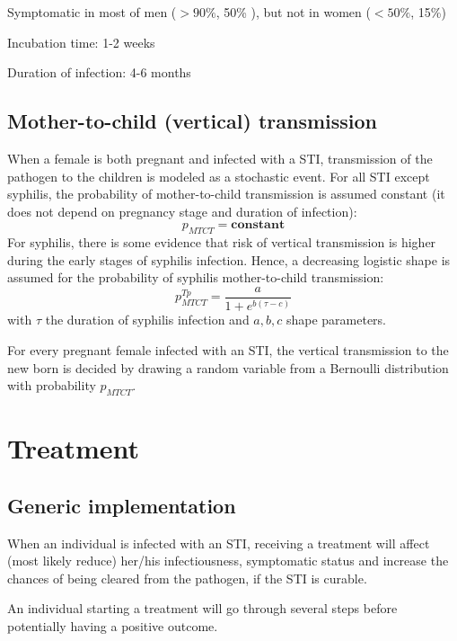 \documentclass[11pt, onecolumn]{article}
\begin{document}
 Symptomatic in most of men ($> 90\%$\cite{Ison:2011eg,Kretzschmar:1996ur}, 50\%\cite{Korenromp:2002gt} ), but not in women ($< 50\%$\cite{Ison:2011eg,Kretzschmar:1996ur}, 15\%\cite{Korenromp:2002gt}) 
 
 Incubation time: 1-2 weeks\cite{Kretzschmar:1996ur}
 
 Duration of infection: 4-6 months \cite{Chen:2010hx,Korenromp:2002gt}

 
 \subsection{Mother-to-child (vertical) transmission}
 
 When a female is both pregnant and infected with a STI, transmission of the pathogen to the children is modeled as a stochastic event. For all STI except syphilis, the probability of mother-to-child transmission is assumed constant (it does not depend on pregnancy stage and duration of infection):
 $$ p_{MTCT} = \mathbf{constant}$$
 For syphilis, there is some evidence \cite{Karumudi:2005jb,Karp:2009hy} that risk of vertical transmission is higher during the early stages of syphilis infection. Hence, a decreasing logistic shape is assumed for the probability of syphilis mother-to-child transmission:
 $$p_{MTCT}^{Tp} = \frac{a}{1+e^{b(\tau-c)}}$$
 with $\tau$ the duration of syphilis infection and $a,b,c$ shape parameters.
 
For every pregnant female infected with an STI, the vertical transmission to the new born is decided by drawing a random variable from a Bernoulli distribution with probability $p_{MTCT}$.
 

\section{Treatment}


\subsection{Generic implementation}

When an individual is infected with an STI, receiving a treatment will affect (most likely reduce) her/his infectiousness, symptomatic status and increase the chances of being cleared from the pathogen, if the STI is curable.

An individual starting a treatment will go through several steps before potentially having a positive outcome. 
\end{document}
